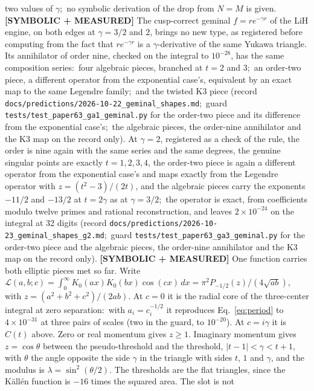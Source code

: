 \documentclass[aps,pra,twocolumn,superscriptaddress,longbibliography]{revtex4-2}
\begin{document}
two values of $\gamma$;\ no symbolic derivation of the drop from $N=M$ is
given.
\textbf{[SYMBOLIC + MEASURED]} The cusp-correct geminal $f=re^{-\gamma r}$
of the LiH engine, on both edges at $\gamma=3/2$ and $2$, brings no new type, as
registered before computing from the fact that $re^{-\gamma r}$ is a
$\gamma$-derivative of the same Yukawa triangle.  Its annihilator of order
nine, checked on the integral to $10^{-28}$, has the same composition
series:\ four algebraic pieces, branched at $t=2$ and $3$;\ an order-two
piece, a different operator from the exponential case's, equivalent by an
exact map to the same Legendre family;\ and the twisted K3 piece (record
\texttt{docs/predictions/2026-10-22\_geminal\_shapes.md};\ guard
\texttt{tests/test\_paper63\_ga1\_geminal.py} for the order-two piece and
its difference from the exponential case's;\ the algebraic pieces, the
order-nine annihilator and the K3 map on the record only).  At $\gamma=2$,
registered as a check of the rule, the order is nine again with the same
series and the same degrees, the genuine singular points are exactly
$t=1,2,3,4$, the order-two piece is again a different operator from the
exponential case's and maps exactly from the Legendre operator with
$z=(t^2-3)/(2t)$, and the algebraic pieces carry the exponents $-11/2$ and
$-13/2$ at $t=2\gamma$ as at $\gamma=3/2$;\ the operator is exact, from
coefficients modulo twelve primes and rational reconstruction, and leaves
$2\times10^{-24}$ on the integral at 32 digits (record
\texttt{docs/predictions/2026-10-23\_geminal\_shapes\_g2.md};\ guard
\texttt{tests/test\_paper63\_ga3\_geminal.py} for the order-two piece and
the algebraic pieces, the order-nine annihilator and the K3 map on the record
only).
\textbf{[SYMBOLIC + MEASURED]} One function carries both elliptic pieces
met so far.  Write
$\mathcal{L}(a,b;c)=\int_0^\infty K_0(ax)K_0(bx)\cos(cx)\,dx
=\pi^2P_{-1/2}(z)/(4\sqrt{ab})$, with $z=(a^2+b^2+c^2)/(2ab)$.  At $c=0$ it
is the radial core of the three-center integral at zero separation:\
with $a_i=c_i^{-1/2}$ it reproduces Eq.~\eqref{eq:period} to
$4\times10^{-31}$ at three pairs of scales (two in the guard, to
$10^{-20}$).  At $c=i\gamma$ it is $C(t)$
above.  Zero or real momentum gives $z\ge1$.  Imaginary momentum gives
$z=\cos\theta$ between the pseudo-threshold and the threshold,
$|t-1|<\gamma<t+1$, with $\theta$ the angle opposite the side $\gamma$ in
the triangle with sides $t$, $1$ and $\gamma$, and the modulus is
$\lambda=\sin^2(\theta/2)$.  The thresholds are the flat triangles, since
the K\"all\'en function is $-16$ times the squared area.  The slot is not
\end{document}
